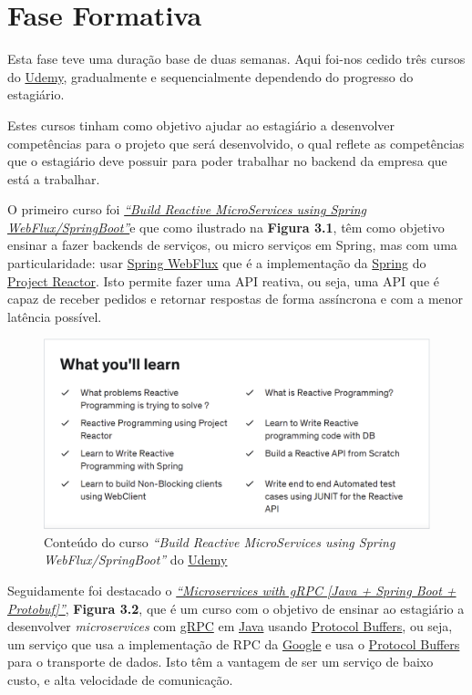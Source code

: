 \section{Fase Formativa}

Esta fase teve uma duração base de duas semanas. Aqui foi-nos cedido três cursos do \href{https://www.udemy.com/}{Udemy}, gradualmente e sequencialmente dependendo do progresso do estagiário.

Estes cursos tinham como objetivo ajudar ao estagiário a desenvolver competências para o projeto que será desenvolvido, o qual reflete as competências que o estagiário deve possuir para poder trabalhar no backend da empresa que está a trabalhar.

O primeiro curso foi \href{https://www.udemy.com/course/build-reactive-restful-apis-using-spring-boot-webflux/}{\textit{``Build Reactive MicroServices using Spring WebFlux/SpringBoot''}}e que como ilustrado na \textbf{Figura 3.1}, têm como objetivo ensinar a fazer backends de serviços, ou micro serviços em Spring, mas com uma particularidade: usar \href{https://spring.io/reactive}{Spring WebFlux} que é a implementação da \href{https://spring.io/}{Spring} do \href{https://projectreactor.io/}{Project Reactor}. Isto permite fazer uma API reativa, ou seja, uma API que é capaz de receber pedidos e retornar respostas de forma assíncrona e com a menor latência possível.

\begin{figure}[!hbt]
  \centering
  \includegraphics[width=14cm]{figuras/udemy1.png}
  \caption{Conteúdo do curso \textit{``Build Reactive MicroServices using Spring WebFlux/SpringBoot''} do \href{https://www.udemy.com/}{Udemy}}
  \label{fig:udemy1}
\end{figure}
\FloatBarrier

Seguidamente foi destacado o \href{https://www.udemy.com/course/grpc-the-complete-guide-for-java-developers/}{\textit{``Microservices with gRPC [Java + Spring Boot + Protobuf]''}}, \textbf{Figura 3.2}, que é um curso com o objetivo de ensinar ao estagiário a desenvolver \textit{microservices} com \href{https://grpc.io/}{gRPC} em \href{https://jdk.java.net/}{Java} usando \href{https://developers.google.com/protocol-buffers}{Protocol Buffers}, ou seja, um serviço que usa a implementação de RPC da \href{https://abc.xyz/}{Google} e usa o \href{https://developers.google.com/protocol-buffers}{Protocol Buffers} para o transporte de dados. Isto têm a vantagem de ser um serviço de baixo custo, e alta velocidade de comunicação.

